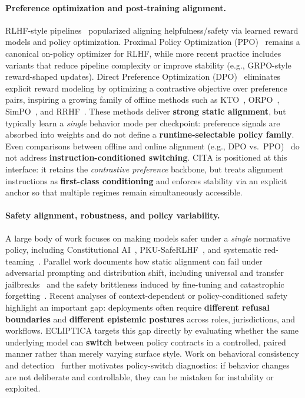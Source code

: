 \paragraph{Preference optimization and post-training alignment.}
RLHF-style pipelines~\cite{ouyang2022training} popularized aligning helpfulness/safety via learned reward models and policy optimization. Proximal Policy Optimization (PPO)~\cite{schulman2017proximal} remains a canonical on-policy optimizer for RLHF, while more recent practice includes variants that reduce pipeline complexity or improve stability (e.g., GRPO-style reward-shaped updates). Direct Preference Optimization (DPO)~\cite{rafailov2023direct} eliminates explicit reward modeling by optimizing a contrastive objective over preference pairs, inspiring a growing family of offline methods such as KTO~\cite{ethayarajh2024kto}, ORPO~\cite{hong2024orpo}, SimPO~\cite{meng2024simpo}, and RRHF~\cite{yuan2023rrhf}. These methods deliver \textbf{strong static alignment}, but typically learn a \emph{single} behavior mode per checkpoint: preference signals are absorbed into weights and do not define a \textbf{runtime-selectable policy family}. Even comparisons between offline and online alignment (e.g., DPO vs.\ PPO)~\cite{xu2024dpo} do not address \textbf{instruction-conditioned switching}. CITA is positioned at this interface: it retains the \emph{contrastive preference} backbone, but treats alignment instructions as \textbf{first-class conditioning} and enforces stability via an explicit anchor so that multiple regimes remain simultaneously accessible.

\paragraph{Safety alignment, robustness, and policy variability.}
A large body of work focuses on making models safer under a \emph{single} normative policy, including Constitutional AI~\cite{bai2022constitutional}, PKU-SafeRLHF~\cite{ji2024pku}, and systematic red-teaming~\cite{perez2022red,ganguli2022red}. Parallel work documents how static alignment can fail under adversarial prompting and distribution shift, including universal and transfer jailbreaks~\cite{zou2023universal,wei2023jailbroken,liu2023jailbreaking} and the safety brittleness induced by fine-tuning and catastrophic forgetting~\cite{qi2023fine,huang2023catastrophic}. Recent analyses of context-dependent or policy-conditioned safety~\cite{bianchi2024safetytuned} highlight an important gap: deployments often require \textbf{different refusal boundaries} and \textbf{different epistemic postures} across roles, jurisdictions, and workflows. ECLIPTICA targets this gap directly by evaluating whether the same underlying model can \textbf{switch} between policy contracts in a controlled, paired manner rather than merely varying surface style. Work on behavioral consistency and detection~\cite{roy2025comprehensive} further motivates policy-switch diagnostics: if behavior changes are not deliberate and controllable, they can be mistaken for instability or exploited.

